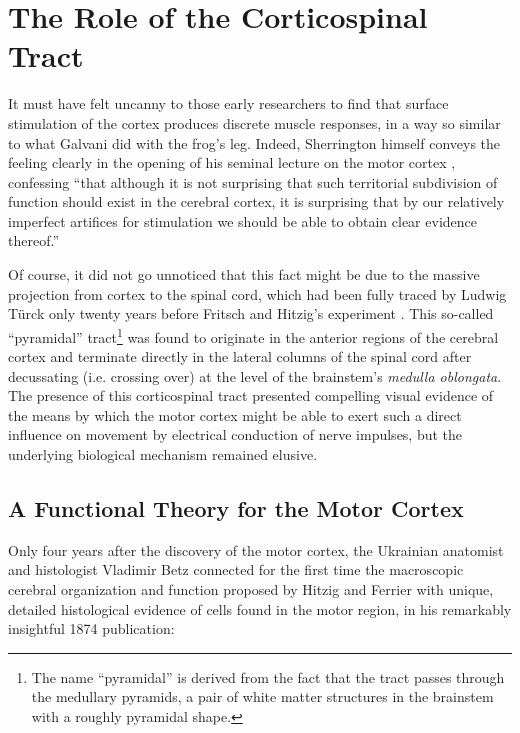 \section{The Role of the Corticospinal Tract}

It must have felt uncanny to those early researchers to find that surface stimulation of the cortex produces discrete muscle responses, in a way so similar to what Galvani did with the frog's leg. Indeed, Sherrington himself conveys the feeling clearly in the opening of his seminal lecture on the motor cortex \cite[p.271]{Sherrington1906}, confessing ``that although it is not surprising that such territorial subdivision of function should exist in the cerebral cortex, it is surprising that by our relatively imperfect artifices for stimulation we should be able to obtain clear evidence thereof.''

Of course, it did not go unnoticed that this fact might be due to the massive projection from cortex to the spinal cord, which had been fully traced by Ludwig Türck only twenty years before Fritsch and Hitzig's experiment \cite{Nathan1955}. This so-called ``pyramidal'' tract\footnote{The name ``pyramidal'' is derived from the fact that the tract passes through the medullary pyramids, a pair of white matter structures in the brainstem with a roughly pyramidal shape.} was found to originate in the anterior regions of the cerebral cortex and terminate directly in the lateral columns of the spinal cord after decussating (i.e. crossing over) at the level of the brainstem's \emph{medulla oblongata}. The presence of this corticospinal tract presented compelling visual evidence of the means by which the motor cortex might be able to exert such a direct influence on movement by electrical conduction of nerve impulses, but the underlying biological mechanism remained elusive.

\subsection{A Functional Theory for the Motor Cortex}

Only four years after the discovery of the motor cortex, the Ukrainian anatomist and histologist Vladimir Betz connected for the first time the macroscopic cerebral organization and function proposed by Hitzig and Ferrier with unique, detailed histological evidence of cells found in the motor region, in his remarkably insightful 1874 publication:

